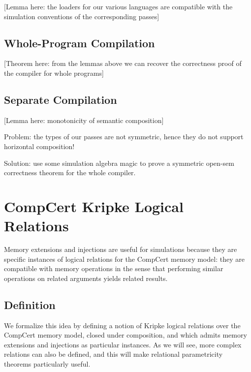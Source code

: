 \documentclass[sigplan,10pt,review,anonymous]{acmart}
\begin{document}
[Lemma here:
the loaders for our various languages
are compatible with the simulation conventions
of the corresponding passes]


\subsection{Whole-Program Compilation} \label{sec:corr:wp} %

[Theorem here: from the lemmas above
we can recover the correctness proof of
the compiler for whole programs]


\subsection{Separate Compilation} \label{sec:corr:sep} %

[Lemma here: monotonicity of semantic composition]

Problem:
the types of our passes are not symmetric,
hence they do not support horizontal composition!

Solution:
use some simulation algebra magic
to prove a symmetric open-sem correctness theorem
for the whole compiler.

\cbend


\section{CompCert Kripke Logical Relations} \label{sec:compcert:cklr} %

Memory extensions and injections
are useful for simulations
because they are specific instances
of logical relations for the CompCert memory model:
they are compatible with memory operations
in the sense that
performing similar operations on related arguments
yields related results.

\subsection{Definition} %

We formalize this idea by defining
a notion of Kripke logical relations over the CompCert memory model,
closed under composition, and which
admits memory extensions and injections as particular instances.
As we will see,
more complex relations can also be defined,
and this will make relational parametricity theorems
particularly useful.
\end{document}
